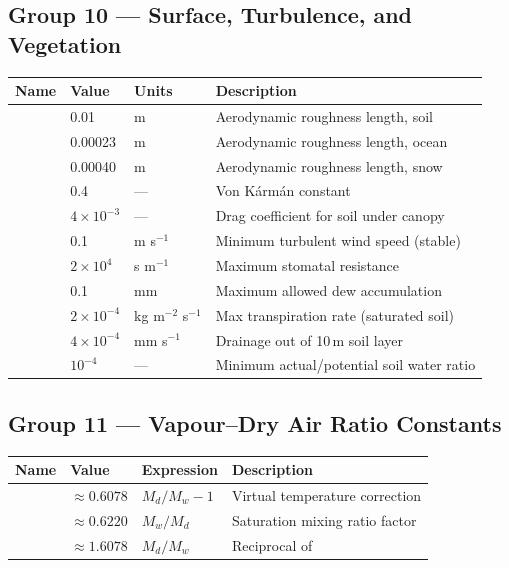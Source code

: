 \subsection{Group 10 --- Surface, Turbulence, and Vegetation}

\begin{longtable}{L{3.5cm} L{3cm} L{3cm} L{4.5cm}}
  \toprule
  \textbf{Name} & \textbf{Value} & \textbf{Units} & \textbf{Description} \\
  \midrule
  \endhead
  \bottomrule
  \endfoot
      & 0.01    & m            & Aerodynamic roughness length, soil \\
      & 0.00023 & m            & Aerodynamic roughness length, ocean \\
      & 0.00040 & m            & Aerodynamic roughness length, snow \\
    & 0.4     & ---          & Von Kármán constant \\
    & $4\times10^{-3}$ & --- & Drag coefficient for soil under canopy \\
      & 0.1     & m s$^{-1}$   & Minimum turbulent wind speed (stable) \\
     & $2\times10^4$ & s m$^{-1}$ & Maximum stomatal resistance \\
    & 0.1     & mm           & Maximum allowed dew accumulation \\
    & $2\times10^{-4}$ & kg m$^{-2}$ s$^{-1}$ & Max transpiration rate (saturated soil) \\
     & $4\times10^{-4}$ & mm s$^{-1}$ & Drainage out of 10\,m soil layer \\
   & $10^{-4}$& ---          & Minimum actual/potential soil water ratio \\
\end{longtable}

\subsection{Group 11 --- Vapour--Dry Air Ratio Constants}

\begin{longtable}{L{3cm} L{3cm} L{4cm} L{5cm}}
  \toprule
  \textbf{Name} & \textbf{Value} & \textbf{Expression} & \textbf{Description} \\
  \midrule
  \endhead
  \bottomrule
  \endfoot
    & $\approx0.6078$ & $M_d/M_w - 1$ & Virtual temperature correction \\
    & $\approx0.6220$ & $M_w/M_d$     & Saturation mixing ratio factor \\
   & $\approx1.6078$ & $M_d/M_w$     & Reciprocal of  \\
\end{longtable}

